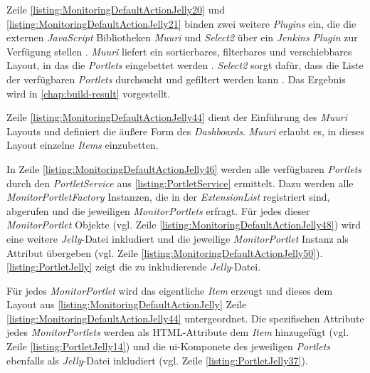 

Zeile \autoref{listing:MonitoringDefaultActionJelly20} und \autoref{listing:MonitoringDefaultActionJelly21} binden zwei weitere \textit{Plugins} ein, die die externen \textit{JavaScript} Bibliotheken \textit{Muuri} und \textit{Select2} über ein \textit{Jenkins} \textit{Plugin} zur Verfügung stellen \citep{muuri-api-plugin, select2-api-plugin}. \textit{Muuri} liefert ein sortierbares, filterbares und verschiebbares Layout, in das die \textit{Portlets} eingebettet werden \citep{muuri}. \textit{Select2} sorgt dafür, dass die Liste der verfügbaren \textit{Portlets} durchsucht und gefiltert werden kann \citep{select2}. Das Ergebnis wird in \autoref{chap:build-result} vorgestellt.

Zeile \autoref{listing:MonitoringDefaultActionJelly44} dient der Einführung des \textit{Muuri} Layouts und definiert die äußere Form des \textit{Dashboards}. \textit{Muuri} erlaubt es, in dieses Layout einzelne \textit{Items} einzubetten.

In Zeile \autoref{listing:MonitoringDefaultActionJelly46} werden alle verfügbaren \textit{Portlets} durch den \textit{PortletService} aus \autoref{listing:PortletService} ermittelt. Dazu werden alle \textit{MonitorPortletFactory} Instanzen, die in der \textit{ExtensionList} registriert sind, abgerufen und die jeweiligen \textit{MonitorPortlets} erfragt. Für jedes dieser \textit{MonitorPortlet} Objekte (vgl. Zeile \autoref{listing:MonitoringDefaultActionJelly48}) wird eine weitere \textit{Jelly}-Datei inkludiert und die jeweilige \textit{MonitorPortlet} Instanz als Attribut übergeben (vgl. Zeile \autoref{listing:MonitoringDefaultActionJelly50}). \autoref{listing:PortletJelly} zeigt die zu inkludierende \textit{Jelly}-Datei.



Für jedes \textit{MonitorPortlet} wird das eigentliche \textit{Item} erzeugt und dieses dem Layout aus \autoref{listing:MonitoringDefaultActionJelly} Zeile \autoref{listing:MonitoringDefaultActionJelly44} untergeordnet. Die spezifischen Attribute jedes \textit{MonitorPortlets} werden als HTML-Attribute dem \textit{Item} hinzugefügt (vgl. Zeile \autoref{listing:PortletJelly14}) und die \ac{ui}-Komponete des jeweiligen \textit{Portlets} ebenfalls als \textit{Jelly}-Datei inkludiert (vgl. Zeile \autoref{listing:PortletJelly37}). 

